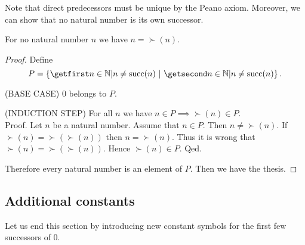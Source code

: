 \documentclass[../../arithmetic.tex]{subfiles}
\begin{document}
  \noindent Note that direct predecessors must be unique by the  Peano
  axiom.
  Moreover, we can show that no natural number is its own successor.

  \begin{forthel}
    \begin{proposition}\label{Arithmetic_01_01_670417}
      For no natural number $n$ we have $n = \succ(n)$.
    \end{proposition}
    \begin{proof}
      Define \[ P = \class{n \in \Nat | n \neq \succ(n)}. \]

      (BASE CASE) $0$ belongs to $P$.

      (INDUCTION STEP) For all $n$ we have $n \in P \implies \succ(n) \in P$. \\
      Proof.
        Let $n$ be a natural number.
        Assume that $n \in P$.
        Then $n \neq \succ(n)$.
        If $\succ(n) = \succ(\succ(n))$ then $n = \succ(n)$.
        Thus it is wrong that $\succ(n) = \succ(\succ(n))$.
        Hence $\succ(n) \in P$.
      Qed.

      Therefore every natural number is an element of $P$.
      Then we have the thesis.
    \end{proof}
  \end{forthel}


  \subsection{Additional constants}

  \noindent Let us end this section by introducing new constant symbols for the
  first few successors of $0$.
\end{document}
